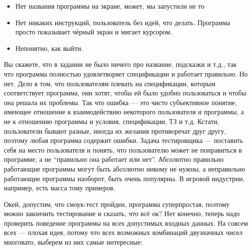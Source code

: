 \documentclass[a5paper]{article}
\begin{document}
\begin{itemize}
    \item Нет названия программы на экране, может, мы запустили не то
    \item Нет никаких инструкций, пользователь без идей, что делать. Программа просто показывает чёрный экран и мигает курсором.
    \item Непонятно, как выйти.
\end{itemize}

Вы скажете, что в задании не было ничего про название, подсказки и т.д., так что программа полностью удовлетворяет спецификации и работает правильно. Но нет. Дело в том, что пользователям плевать на спецификации, которым соответствует программа, они хотят, чтобы ей было удобно пользоваться и чтобы она решала их проблемы. Так что ошибка --- это чисто субъективное понятие, имеющее отношение к взаимодействию некоторого пользователя и программы, а не к отношению программы и условия, спецификации, ТЗ и т.д. Кстати, пользователи бывают разные, иногда их желания противоречат друг другу, поэтому любая программа содержит ошибки. Задача тестировщика --- поставить себя на место пользователя и понять, что пользователю может не понравиться в программе, а не ``правильно она работает или нет''. Абсолютно правильно работающие программы могут быть абсолютно никому не нужны, а неправильно работающие программы наоборот, быть очень популярны. В игровой индустрии, например, есть масса тому примеров.

Окей, допустим, что смоук-тест пройден, программа суперпростая, поэтому можно закончить тестирование и сказать, что всё ок? Нет конечно, теперь надо проверить поведение программы на всех допустимых входных данных. На совсем всех --- плохая идея, потому что всех возможных комбинаций двузначных чисел многовато, выберем из них самые интересные:
\end{document}
